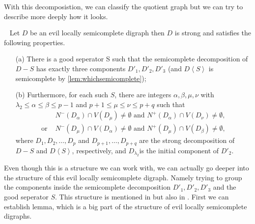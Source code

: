 With this decomposistion, we can classify the quotient graph but we can try to describe more deeply how it looks.
\begin{thm}~\cite{bangJGT85,bangJCT102}
    Let $D$ be an evil locally semicomplete digraph then $D$ is strong and satisfies the following properties.
    \begin{itemize}
        \item[(a)]There is a good seperator S such that the semicomplete decomposition of $D-S$ has exactly three components $D'_1,D'_2,D'_3$ (and $D\left<S\right>$ is semicomplete by \autoref{lem:whichsemicomplete});
        \item[(b)] Furthermore, for each such $S$, there are integers $\alpha, \beta,\mu,\nu$ with $\lambda_2\leq \alpha \leq \beta \leq p-1$ and $p+1\leq \mu \leq \nu \leq p+q$ such that 
        \begin{align}
            &N^-(D_\alpha)\cap V(D_\mu)\neq \emptyset \text{ and } N^+(D_\alpha)\cap V(D_\nu)\neq \emptyset,\\
            \text{or } &N^-(D_\mu)\cap V(D_\alpha)\neq \emptyset \text{ and } N^+(D_\mu)\cap V(D_\beta)\neq \emptyset,
        \end{align} 
        where $D_1,D_2,\dots, D_p$ and $D_{p+1},\dots,D_{p+q}$ are the strong decomposition of $D-S$ and $D\left< S\right>$, respectively, and $D_{\lambda_2}$is the initial component of $D'_2$. 
    \end{itemize}
    \label{thm:evildecom}
\end{thm}
Even though this is a structure we can work with, we can actually go deeper into the structure of this evil locally semicomplete digraph. 
Namely trying to group the components inside the semicomplete decomposition $D'_1,D'_2,D'_3$ and the good seperator $S$. 
This structure is mentioned in \cite{bangJGT85} but also in \cite{tildeDMCS}. 
First we can establish lemma, which is a big part of the structure of evil locally semicomplete digraphs.
